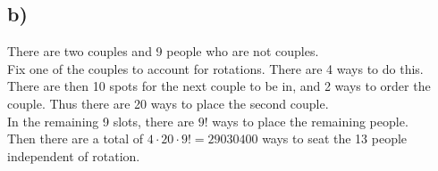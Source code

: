 \documentclass{article}
\begin{document}
\subsection*{b)}
There are two couples and 9 people who are not couples.
\\Fix one of the couples to account for rotations.
There are 4 ways to do this.
\\There are then 10 spots for the next couple to be in,
and 2 ways to order the couple.
Thus there are 20 ways to place the second couple.
\\In the remaining 9 slots, there are $9!$ ways to place the remaining people.
\\Then there are a total of $4 \cdot 20 \cdot 9! = 29030400$ ways to seat the 13
people independent of rotation.
\end{document}
